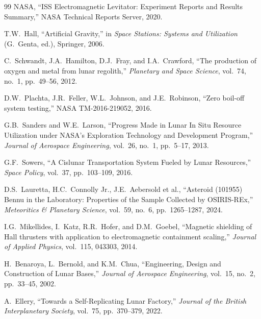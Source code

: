 \documentclass[preprint,12pt]{elsarticle}
\begin{document}
\begin{thebibliography}{99}
NASA, ``ISS Electromagnetic Levitator: Experiment Reports and Results Summary,'' NASA Technical Reports Server, 2020.

T.W.\ Hall, ``Artificial Gravity,'' in \textit{Space Stations: Systems and Utilization} (G.\ Genta, ed.), Springer, 2006.

C.\ Schwandt, J.A.\ Hamilton, D.J.\ Fray, and I.A.\ Crawford, ``The production of oxygen and metal from lunar regolith,'' \textit{Planetary and Space Science}, vol.~74, no.~1, pp.~49--56, 2012.

D.W.\ Plachta, J.R.\ Feller, W.L.\ Johnson, and J.E.\ Robinson, ``Zero boil-off system testing,'' NASA TM-2016-219052, 2016.

G.B.\ Sanders and W.E.\ Larson, ``Progress Made in Lunar In Situ Resource Utilization under NASA's Exploration Technology and Development Program,'' \textit{Journal of Aerospace Engineering}, vol.~26, no.~1, pp.~5--17, 2013.

G.F.\ Sowers, ``A Cislunar Transportation System Fueled by Lunar Resources,'' \textit{Space Policy}, vol.~37, pp.~103--109, 2016.

D.S.\ Lauretta, H.C.\ Connolly Jr., J.E.\ Aebersold et al., ``Asteroid (101955) Bennu in the Laboratory: Properties of the Sample Collected by OSIRIS-REx,'' \textit{Meteoritics \& Planetary Science}, vol.~59, no.~6, pp.~1265--1287, 2024.

I.G.\ Mikellides, I.\ Katz, R.R.\ Hofer, and D.M.\ Goebel, ``Magnetic shielding of Hall thrusters with application to electromagnetic containment scaling,'' \textit{Journal of Applied Physics}, vol.~115, 043303, 2014.

H.\ Benaroya, L.\ Bernold, and K.M.\ Chua, ``Engineering, Design and Construction of Lunar Bases,'' \textit{Journal of Aerospace Engineering}, vol.~15, no.~2, pp.~33--45, 2002.

A.\ Ellery, ``Towards a Self-Replicating Lunar Factory,'' \textit{Journal of the British Interplanetary Society}, vol.~75, pp.~370--379, 2022.

\end{thebibliography}
\end{document}
